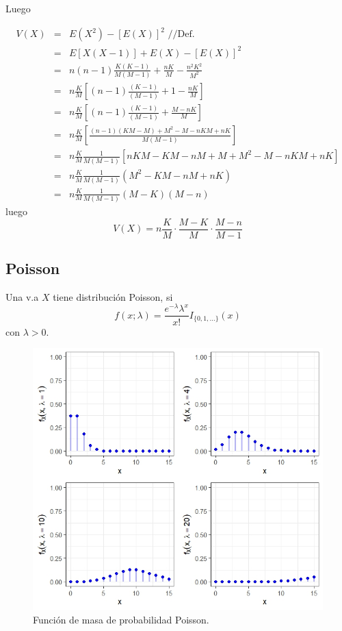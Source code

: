 \begin{i}
Luego

\begin{eqnarray*}
V(X) &=&E(X^{2})-[E(X)]^{2}\text{ \ //Def.} \\
&=&E[X(X-1)]+E(X)-[E(X)]^{2} \\
&=&n(n-1)\frac{K(K-1)}{M\left( M-1\right) }+\frac{nK}{M}-\frac{n^{2}K^{2}}{
M^{2}} \\
&=&n\frac{K}{M}\left[ (n-1)\frac{(K-1)}{\left( M-1\right) }+1-\frac{nK}{M}
\right] \\
&=&n\frac{K}{M}\left[ (n-1)\frac{(K-1)}{\left( M-1\right) }+\frac{M-nK}{M}
\right] \\
&=&n\frac{K}{M}\left[ \frac{(n-1)(KM-M)+M^{2}-M-nKM+nK}{M\left( M-1\right) }%
\right] \\
&=&n\frac{K}{M}\frac{1}{M(M-1)}\left[ nKM-KM-nM+M+M^{2}-M-nKM+nK\right] \\
&=&n\frac{K}{M}\frac{1}{M(M-1)}\left( M^{2}-KM-nM+nK\right) \\
&=&n\frac{K}{M}\frac{1}{M(M-1)}(M-K)(M-n)
\end{eqnarray*}%
luego%
\begin{equation*}
V(X)=n\frac{K}{M}\cdot \frac{M-K}{M}\cdot \frac{M-n}{M-1}
\end{equation*}


\subsection{Poisson}

\begin{definition}
Una v.a $X$ tiene distribución Poisson, si 
\begin{equation*}
f(x;\lambda )=\frac{e^{-\lambda }\lambda ^{x}}{x!}I_{\{0,1,...\}}(x)
\end{equation*}%
con $\lambda >0.$
\end{definition}

\begin{figure}[h!]
\centering
\includegraphics[scale=1]{Figuras/Poisson.jpeg}
\caption{Función de masa de probabilidad Poisson.}
\end{figure}


\end{i}
